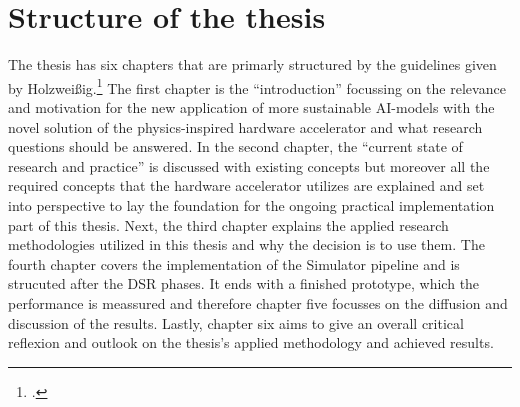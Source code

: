 \section{Structure of the thesis}
The thesis has six chapters that are primarly structured by the guidelines given by Holzweißig.\footcite[cf.][32-40]{holzweissigWissenschaftlichesArbeiten2017}
The first chapter is the ``introduction'' focussing on the relevance and motivation for the new application of more sustainable AI-models
with the novel solution of the physics-inspired hardware accelerator and what research questions should be answered.
In the second chapter, the ``current state of research and practice'' is discussed with 
existing concepts but moreover all the required concepts that the hardware accelerator utilizes are explained 
and set into perspective to lay the foundation for the ongoing practical implementation part of this thesis.
Next, the third chapter explains the applied research methodologies utilized in this thesis and why the decision is to use them.
The fourth chapter covers the implementation of the Simulator pipeline and is strucuted after the \ac{DSR} phases.
It ends with a finished prototype, which the performance is meassured and therefore chapter five focusses on the 
diffusion and discussion of the results. 
Lastly, chapter six aims to give an overall critical reflexion and outlook on the thesis's applied methodology and achieved results.









